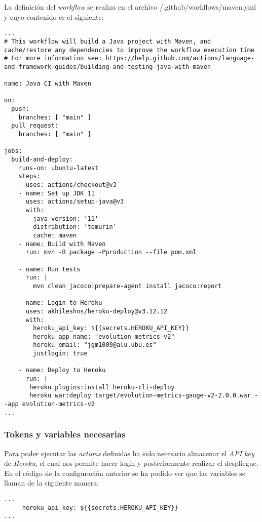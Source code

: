 La definición del \textit{workflow} se realiza en el archivo /.github/workflows/maven.yml y cuyo contenido es el siguiente:
\begin{minipage}{\linewidth}
{\tiny
\begin{verbatim}
...
# This workflow will build a Java project with Maven, and cache/restore any dependencies to improve the workflow execution time
# For more information see: https://help.github.com/actions/language-and-framework-guides/building-and-testing-java-with-maven

name: Java CI with Maven

on:
  push:
    branches: [ "main" ]
  pull_request:
    branches: [ "main" ]

jobs:
  build-and-deploy:
    runs-on: ubuntu-latest
    steps:
    - uses: actions/checkout@v3
    - name: Set up JDK 11
      uses: actions/setup-java@v3
      with:
        java-version: '11'
        distribution: 'temurin'
        cache: maven
    - name: Build with Maven
      run: mvn -B package -Pproduction --file pom.xml
 
    - name: Run tests
      run: | 
        mvn clean jacoco:prepare-agent install jacoco:report
        
    - name: Login to Heroku
      uses: akhileshns/heroku-deploy@v3.12.12
      with:
        heroku_api_key: ${{secrets.HEROKU_API_KEY}}
        heroku_app_name: "evolution-metrics-v2"
        heroku_email: "jgm1009@alu.ubu.es"
        justlogin: true
        
    - name: Deploy to Heroku
      run: |
       heroku plugins:install heroku-cli-deploy
       heroku war:deploy target/evolution-metrics-gauge-v2-2.0.0.war --app evolution-metrics-v2
...
\end{verbatim}
}
\end{minipage}


\subsubsection{Tokens y variables necesarias}
Para poder ejecutar las \textit{actions} definidas ha sido necesario almacenar el \textit{API key} de \textit{Heroku}, el cual nos permite hacer login y posteriormente realizar el despliegue. En el código de la configuración anterior se ha podido ver que las variables se llaman de la siguiente manera: 

\begin{minipage}{\linewidth}
{\tiny
\begin{verbatim}
...
     heroku_api_key: ${{secrets.HEROKU_API_KEY}}
...
\end{verbatim}
}
\end{minipage}

